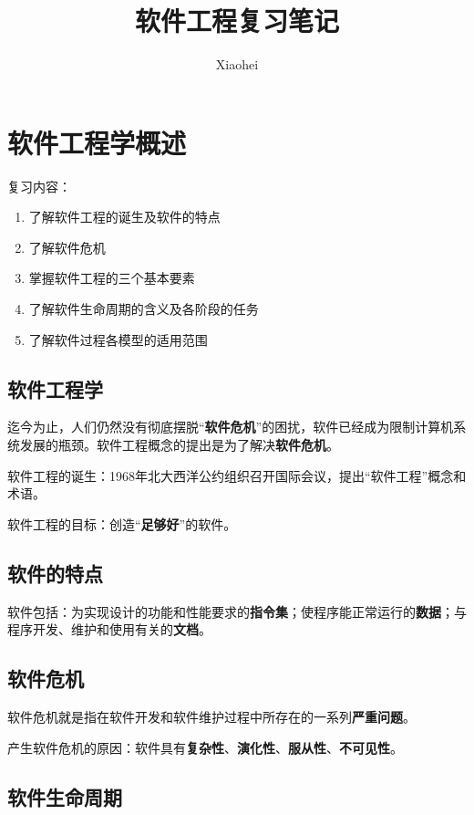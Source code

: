 \documentclass[cn, blue, normal, 12pt]{elegantnote}
\title{软件工程复习笔记}
\author{Xiaohei}
\institute{Created by Elegant\LaTeX{}}
\date{\zhtoday}
\begin{document}
\maketitle

\section{软件工程学概述}

复习内容：

\begin{enumerate}
    \item 了解软件工程的诞生及软件的特点
    \item 了解软件危机
    \item 掌握软件工程的三个基本要素
    \item 了解软件生命周期的含义及各阶段的任务
    \item 了解软件过程各模型的适用范围
\end{enumerate}

\subsection{软件工程学}

迄今为止，人们仍然没有彻底摆脱“\textbf{软件危机}”的困扰，软件已经成为限制计算机系统发展的瓶颈。软件工程概念的提出是为了解决\textbf{软件危机}。

软件工程的诞生：1968年北大西洋公约组织召开国际会议，提出“软件工程”概念和术语。

软件工程的目标：创造“\textbf{足够好}”的软件。

\subsection{软件的特点}

软件包括：为实现设计的功能和性能要求的\textbf{指令集}；使程序能正常运行的\textbf{数据}；与程序开发、维护和使用有关的\textbf{文档}。

\subsection{软件危机}

软件危机就是指在软件开发和软件维护过程中所存在的一系列\textbf{严重问题}。

产生软件危机的原因：软件具有\textbf{复杂性}、\textbf{演化性}、\textbf{服从性}、\textbf{不可见性}。

\subsection{软件生命周期}
\end{document}
